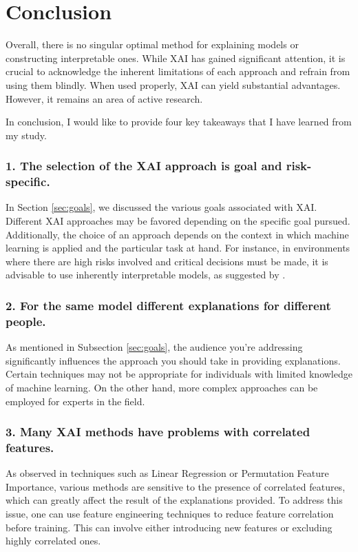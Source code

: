 
\newpage
\section{Conclusion}\label{sec:6}

Overall, there is no singular optimal method for explaining models or constructing interpretable ones. While XAI has gained significant attention, it is crucial to acknowledge the inherent limitations of each approach and refrain from using them blindly. When used properly, XAI can yield substantial advantages. However, it remains an area of active research.

In conclusion, I would like to provide four key takeaways that I have learned from my study.

\subsubsection*{1. The selection of the XAI approach is goal and risk-specific.}
In Section \ref{sec:goals}, we discussed the various goals associated with XAI. Different XAI approaches may be favored depending on the specific goal pursued. \\
Additionally, the choice of an approach depends on the context in which machine learning is applied and the particular task at hand. For instance, in environments where there are high risks involved and critical decisions must be made, it is advisable to use inherently interpretable models, as suggested by \cite{rudin2019stop}.

\subsubsection*{2. For the same model different explanations for different people.}
As mentioned in Subsection \ref{sec:goals}, the audience you're addressing significantly influences the approach you should take in providing explanations. Certain techniques may not be appropriate for individuals with limited knowledge of machine learning. On the other hand, more complex approaches can be employed for experts in the field.

\subsubsection*{3. Many XAI methods have problems with correlated features.}
As observed in techniques such as Linear Regression or Permutation Feature Importance, various methods are sensitive to the presence of correlated features, which can greatly affect the result of the explanations provided.
To address this issue, one can use feature engineering techniques to reduce feature correlation before training. This can involve either introducing new features or excluding highly correlated ones.

